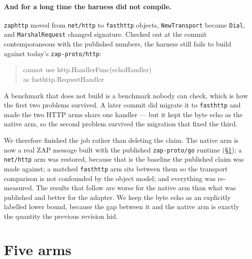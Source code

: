 \documentclass[11pt]{article}
\begin{document}
\paragraph{And for a long time the harness did not compile.} \texttt{zaphttp}
moved from \texttt{net/http} to \texttt{fasthttp} objects, \texttt{NewTransport}
became \texttt{Dial}, and \texttt{MarshalRequest} changed signature. Checked out at
the commit contemporaneous with the published numbers, the harness still fails to
build against today's \texttt{zap-proto/http}:
\begin{quote}\ttfamily\small
cannot use http.HandlerFunc(echoHandler)\\
as fasthttp.RequestHandler
\end{quote}
A benchmark that does
not build is a benchmark nobody can check, which is how the first two problems
survived. A later commit did migrate it to \texttt{fasthttp} and made the two HTTP
arms share one handler --- but it kept the byte echo as the native arm, so the
second problem survived the migration that fixed the third.

We therefore finished the job rather than deleting the claim. The native arm is
now a real ZAP message built with the published \texttt{zap-proto/go} runtime
(\S\ref{sec:arms}); a \texttt{net/http} arm was restored, because that is the
baseline the published claim was made against; a matched \texttt{fasthttp} arm
sits between them so the transport comparison is not confounded by the object
model; and everything was re-measured. The results that follow are worse for the
native arm than what was published and better for the adapter. We keep the byte
echo as an explicitly labelled lower bound, because the gap between it and the
native arm is exactly the quantity the previous revision hid.

\section{Five arms}
\label{sec:arms}
\end{document}
